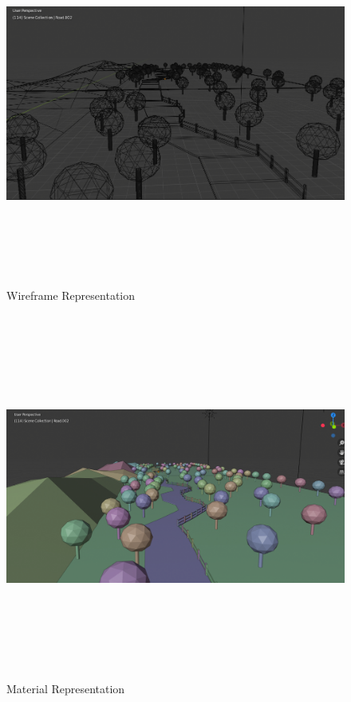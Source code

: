 \documentclass{report}
\begin{document}
    \medskip
    \begin{figure}[h!]
      \centering
        \includegraphics[width=12cm,height=12cm,keepaspectratio]{development-wireframe.png}
        \caption{Wireframe Representation}
    \end{figure}
    \medskip
    \begin{figure}[h!]
      \centering
        \includegraphics[width=12cm,height=12cm,keepaspectratio]{development-material.png}
        \caption{Material Representation}
    \end{figure}
\end{document}
